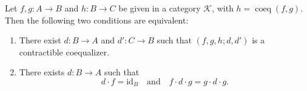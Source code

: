 Let $f, g: A \to B$ and $h: B \to C$ be given in a category $\mathcal{K}$, with $h = \operatorname{coeq}(f, g)$. Then the following two conditions are equivalent:

\begin{enumerate}
\item[1.] There exist $d: B \to A$ and $d': C \to B$ such that $(f, g, h; d, d')$ is a contractible coequalizer.
\item[2.] There exists $d: B \to A$ such that
$$d \cdot f = \mathrm{id}_B \quad \text{and} \quad f \cdot d \cdot g = g \cdot d \cdot g.$$
\end{enumerate}
